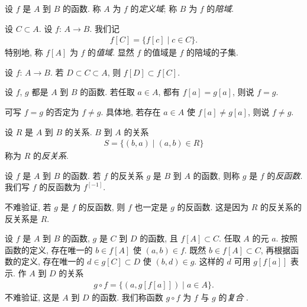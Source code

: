 \begin{definition}
    设 $f$ 是 $A$ 到 $B$ 的函数.
    称 $A$ 为 $f$ 的\emph{定义域};
    称 $B$ 为 $f$ 的\emph{陪域}.
\end{definition}

\begin{definition}
    设 $C \subset A$.
    设 $f$: $A \to B$.
    我们记
    \begin{align*}
        f[C] = \{ f[c] \mid \text{$c \in C$} \}.
    \end{align*}
    特别地, 称 $f[A]$ 为 $f$ 的\emph{值域}.
    显然 $f$ 的值域是 $f$ 的陪域的子集.
\end{definition}

\begin{remark}
    设 $f$: $A \to B$.
    若 $D \subset C \subset A$, 则 $f[D] \subset f[C]$.
\end{remark}

\begin{definition}
    设 $f$, $g$ 都是 $A$ 到 $B$ 的函数.
    若任取 $a \in A$, 都有 $f[a] = g[a]$, 则说 $f = g$.

    可写 $f = g$ 的否定为 $f \neq g$.
    具体地, 若存在 $a \in A$ 使 $f[a] \neq g[a]$,
    则说 $f \neq g$.
\end{definition}

\begin{definition}
    设 $R$ 是 $A$ 到 $B$ 的关系.
    $B$ 到 $A$ 的关系
    \begin{align*}
        S = \{ (b, a) \mid (a, b) \in R \}
    \end{align*}
    称为 $R$ 的\emph{反关系}.
\end{definition}

\begin{definition}
    设 $f$ 是 $A$ 到 $B$ 的函数.
    若 $f$ 的反关系 $g$ 是 $B$ 到 $A$ 的函数,
    则称 $g$ 是 $f$ 的\emph{反函数}.
    我们写 $f$ 的反函数为 $f^{[-1]}$.
\end{definition}

\begin{remark}
    不难验证, 若 $g$ 是 $f$ 的反函数,
    则 $f$ 也一定是 $g$ 的反函数.
    这是因为 $R$ 的反关系的反关系是 $R$.
\end{remark}

\begin{definition}
    设 $f$ 是 $A$ 到 $B$ 的函数,
    $g$ 是 $C$ 到 $D$ 的函数,
    且 $f[A] \subset C$.
    任取 $A$ 的元 $a$.
    按照函数的定义,
    存在唯一的 $b \in f[A]$ 使 $(a, b) \in f$.
    既然 $b \in f[A] \subset C$,
    再根据函数的定义,
    存在唯一的 $d \in g[C] \subset D$ 使 $(b, d) \in g$.
    这样的 $d$ 可用 $g[f[a]]$ 表示.
    作 $A$ 到 $D$ 的关系
    \begin{align*}
        g \circ f = \{ (a, g[f[a]]) \mid a \in A \}.
    \end{align*}
    不难验证, 这是 $A$ 到 $D$ 的函数.
    我们称函数 $g \circ f$ 为 $f$ 与 $g$ 的\emph{复合}%
    .
\end{definition}


